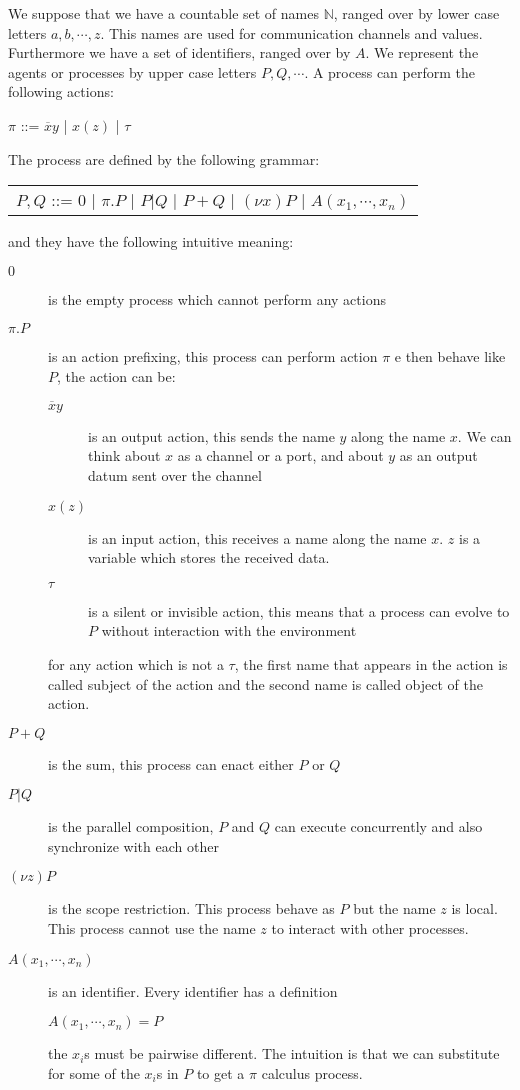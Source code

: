 We suppose that we have a countable set of names $\mathbb{N}$, ranged over by lower case letters $a,b, \cdots, z$. This names are used for communication channels and values. Furthermore we have a set of identifiers, ranged over by $A$. We represent the agents or processes by upper case letters $P,Q, \cdots $. A process can perform the following actions:
\begin{center}
  $\pi$ ::= $\overline{x}y$ | $x(z)$ | $\tau$ 
\end{center}
The process are defined by the following grammar:
\begin{center}
  \begin{tabular}{l}
    $P,Q$ ::= $0$ | $\pi.P$ | $P|Q$ | $P+Q$ | $(\nu x) P$ | $A(x_{1}, \cdots, x_{n})$ 
  \end{tabular}
\end{center}
and they have the following intuitive meaning:
\begin{description}
  \item[$0$] 
    is the empty process which cannot perform any actions
  \item[$\pi.P$] 
    is an action prefixing, this process can perform action $\pi$ e then behave like $P$, the action can be:
    \begin{description}
      \item[$\overline{x}y$] 
	is an output action, this sends the name $y$ along the name $x$. We can think about $x$ as a channel or a port, and about $y$ as an output datum sent over the channel
      \item[$x(z)$] 
	is an input action, this receives a name along the name $x$. $z$ is a variable which stores the received data.
      \item[$\tau$] 
	is a silent or invisible action, this means that a process can evolve to $P$ without interaction with the environment 
    \end{description}
    for any action which is not a $\tau$, the first name that appears in the action is called subject of the action and the second name is called object of the action.
  \item[$P+Q$] 
    is the sum, this process can enact either $P$ or $Q$
  \item[$P|Q$] 
    is the parallel composition, $P$ and $Q$ can execute concurrently and also synchronize with each other
  \item[$(\nu z) P$] 
    is the scope restriction. This process behave as $P$ but the name $z$ is local. This process cannot use the name $z$ to interact with other processes.
  \item[$A(x_{1}, \cdots, x_{n})$] 
    is an identifier. Every identifier has a definition
    \begin{center}
      $A(x_{1}, \cdots, x_{n})=P$
    \end{center}
    the $x_{i}$s must be pairwise different. The intuition is that we can substitute for some of the $x_{i}$s in $P$ to get a $\pi$ calculus process. 
\end{description}

